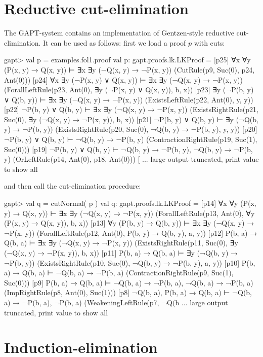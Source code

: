 \documentclass[a4paper,11pt]{book}
\begin{document}
\section{Reductive cut-elimination}

The GAPT-system contains an implementation of Gentzen-style reductive
cut-elimination.  It can be used as follows: first we load a proof $p$ with
cuts:

\begin{clilisting}
gapt> val p = examples.fol1.proof
val p: gapt.proofs.lk.LKProof = [p25] ∀x ∀y (P(x, y) → Q(x, y)) ⊢ ∃x ∃y (¬Q(x, y) → ¬P(x, y))    (CutRule(p9, Suc(0), p24, Ant(0)))
[p24] ∀x ∃y (¬P(x, y) ∨ Q(x, y)) ⊢ ∃x ∃y (¬Q(x, y) → ¬P(x, y))    (ForallLeftRule(p23, Ant(0), ∃y (¬P(x, y) ∨ Q(x, y)), b, x))
[p23] ∃y (¬P(b, y) ∨ Q(b, y)) ⊢ ∃x ∃y (¬Q(x, y) → ¬P(x, y))    (ExistsLeftRule(p22, Ant(0), y, y))
[p22] ¬P(b, y) ∨ Q(b, y) ⊢ ∃x ∃y (¬Q(x, y) → ¬P(x, y))    (ExistsRightRule(p21, Suc(0), ∃y (¬Q(x, y) → ¬P(x, y)), b, x))
[p21] ¬P(b, y) ∨ Q(b, y) ⊢ ∃y (¬Q(b, y) → ¬P(b, y))    (ExistsRightRule(p20, Suc(0), ¬Q(b, y) → ¬P(b, y), y, y))
[p20] ¬P(b, y) ∨ Q(b, y) ⊢ ¬Q(b, y) → ¬P(b, y)    (ContractionRightRule(p19, Suc(1), Suc(0)))
[p19] ¬P(b, y) ∨ Q(b, y) ⊢ ¬Q(b, y) → ¬P(b, y), ¬Q(b, y) → ¬P(b, y)    (OrLeftRule(p14, Ant(0), p18, Ant(0)))
[ ... large output truncated, print value to show all

\end{clilisting}
%
and then call the cut-elimination procedure:
\begin{clilisting}
gapt> val q = cutNormal( p )
val q: gapt.proofs.lk.LKProof = [p14] ∀x ∀y (P(x, y) → Q(x, y)) ⊢ ∃x ∃y (¬Q(x, y) → ¬P(x, y))    (ForallLeftRule(p13, Ant(0), ∀y (P(x, y) → Q(x, y)), b, x))
[p13] ∀y (P(b, y) → Q(b, y)) ⊢ ∃x ∃y (¬Q(x, y) → ¬P(x, y))    (ForallLeftRule(p12, Ant(0), P(b, y) → Q(b, y), a, y))
[p12] P(b, a) → Q(b, a) ⊢ ∃x ∃y (¬Q(x, y) → ¬P(x, y))    (ExistsRightRule(p11, Suc(0), ∃y (¬Q(x, y) → ¬P(x, y)), b, x))
[p11] P(b, a) → Q(b, a) ⊢ ∃y (¬Q(b, y) → ¬P(b, y))    (ExistsRightRule(p10, Suc(0), ¬Q(b, y) → ¬P(b, y), a, y))
[p10] P(b, a) → Q(b, a) ⊢ ¬Q(b, a) → ¬P(b, a)    (ContractionRightRule(p9, Suc(1), Suc(0)))
[p9] P(b, a) → Q(b, a) ⊢ ¬Q(b, a) → ¬P(b, a), ¬Q(b, a) → ¬P(b, a)    (ImpRightRule(p8, Ant(0), Suc(1)))
[p8] ¬Q(b, a), P(b, a) → Q(b, a) ⊢ ¬Q(b, a) → ¬P(b, a), ¬P(b, a)    (WeakeningLeftRule(p7, ¬Q(b ... large output truncated, print value to show all

\end{clilisting}

\section{Induction-elimination}
\end{document}
